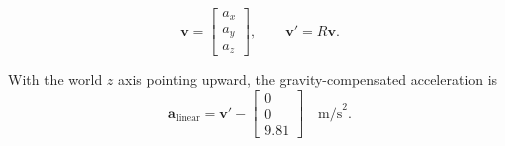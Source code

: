 \documentclass{article}
\begin{document}
\[
\mathbf{v} =
\begin{bmatrix}
a_x \\
a_y \\
a_z
\end{bmatrix},
\qquad
\mathbf{v}' = R\mathbf{v}.
\]

With the world $z$ axis pointing upward, the gravity-compensated acceleration is
\[
\mathbf{a}_{\text{linear}} = \mathbf{v}' -
\begin{bmatrix}
0 \\
0 \\
9.81
\end{bmatrix}
\quad \text{m/s}^2.
\]
\end{document}
